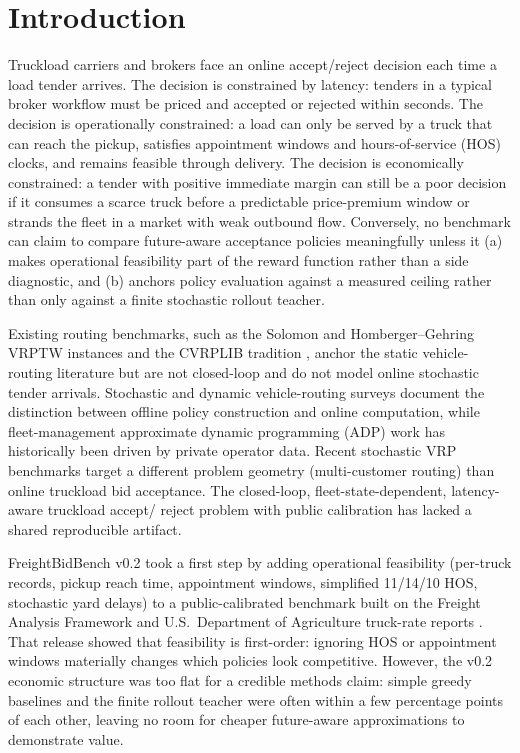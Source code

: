 \documentclass[11pt]{article}
\begin{document}
\section{Introduction}

Truckload carriers and brokers face an online accept/reject decision each
time a load tender arrives. The decision is constrained by latency: tenders
in a typical broker workflow must be priced and accepted or rejected within
seconds. The decision is operationally constrained: a load can only be
served by a truck that can reach the pickup, satisfies appointment windows
and hours-of-service (HOS) clocks, and remains feasible through delivery.
The decision is economically constrained: a tender with positive immediate
margin can still be a poor decision if it consumes a scarce truck before a
predictable price-premium window or strands the fleet in a market with weak
outbound flow. Conversely, no benchmark can claim to compare future-aware
acceptance policies meaningfully unless it (a) makes operational
feasibility part of the reward function rather than a side diagnostic, and
(b) anchors policy evaluation against a measured ceiling rather than only
against a finite stochastic rollout teacher.

Existing routing benchmarks, such as the Solomon and Homberger--Gehring
VRPTW instances \citep{solomon1987vrptw,homberger2005vrptw} and the CVRPLIB
tradition \citep{uchoa2017cvrp}, anchor the static vehicle-routing
literature but are not closed-loop and do not model online stochastic
tender arrivals. Stochastic and dynamic vehicle-routing surveys
\citep{pillac2013review,ritzinger2016survey} document the distinction
between offline policy construction and online computation, while
fleet-management approximate dynamic programming (ADP) work
\citep{simao2009adp,powell2007stochastic,powell2014locomotive,topaloglu2006dynamic}
has historically been driven by private operator data. Recent stochastic
VRP benchmarks \citep{heakl2025svrpbench} target a different problem
geometry (multi-customer routing) than online truckload bid acceptance.
The closed-loop, fleet-state-dependent, latency-aware truckload accept/
reject problem with public calibration has lacked a shared reproducible
artifact.

FreightBidBench v0.2 took a first step by adding operational feasibility
(per-truck records, pickup reach time, appointment windows, simplified
11/14/10 HOS, stochastic yard delays) to a public-calibrated benchmark
built on the Freight Analysis Framework \citep{btsfaf5} and U.S.\
Department of Agriculture truck-rate reports \citep{usdafvwtrk}. That
release showed that feasibility is first-order: ignoring HOS or appointment
windows materially changes which policies look competitive. However, the
v0.2 economic structure was too flat for a credible methods claim: simple
greedy baselines and the finite rollout teacher were often within a few
percentage points of each other, leaving no room for cheaper future-aware
approximations to demonstrate value.
\end{document}
